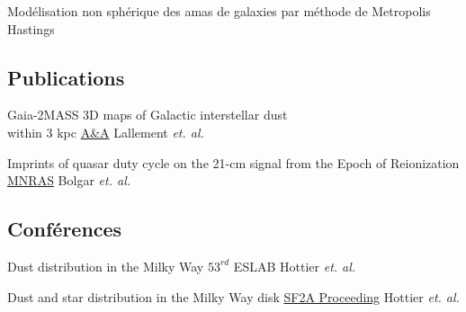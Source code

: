 \documentclass[
 a4paper, 11pt,
  sidebarwidth=0.32\paperwidth,
]{fortysecondscv}
\begin{document}
\makefrontsidebar

\begin{cvtable}
  {Modélisation non sphérique des amas de galaxies par méthode de Metropolis Hastings}
\end{cvtable}


\begin{cvtable}
\end{cvtable}

\subsection{Publications}
\begin{cvtable}
  {Gaia-2MASS 3D maps of Galactic interstellar dust\\within 3 kpc}
  {\href{https://ui.adsabs.harvard.edu/\#abs/2019arXiv190204116L/abstract}{A\&A}}
  {Lallement \textit{et. al.}}

  {Imprints of quasar duty cycle on the 21-cm signal from the Epoch of Reionization}
  {\href{https://ui.adsabs.harvard.edu/\#abs/2019arXiv190204116L/abstract}{MNRAS}}
  {Bolgar \textit{et. al.}}
\end{cvtable}

\subsection{Conférences}
\begin{cvtable}
  {Dust distribution in the Milky Way}
  {$53^{rd}$ ESLAB}
  {Hottier \textit{et. al.}}

  {Dust and star distribution in the Milky Way disk}
  {\href{https://ui.adsabs.harvard.edu/\#abs/2018sf2a.conf..345H/abstract}{SF2A Proceeding}}
  {Hottier \textit{et. al.}}
\end{cvtable}
\end{document}
